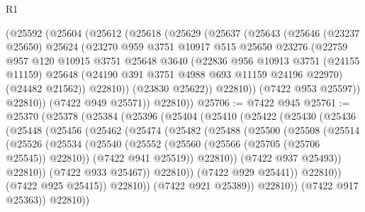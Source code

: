 \begin{lexlean}{R1}
\begin{coremodule}
      (@25592
        (@25604
          (@25612
            (@25618
              (@25629
                (@25637
                  (@25643
                    (@25646
                      (@23237 @25650)
                      @25624
                      (@23270
                        @959
                        @3751
                        @10917
                        @515
                        @25650
                        @23276
                        (@22759
                          @957
                          @120
                          @10915
                          @3751
                          @25648
                          @3640
                          (@22836
                            @956
                            @10913
                            @3751
                            (@24155 @11159)
                            @25648
                            (@24190 @391 @3751 @4988 @693 @11159 @24196 @22970)
                            (@24482 @21562))
                          @22810))
                      (@23830 @25622))
                    @22810))
                (@7422 @953 @25597))
              @22810))
          (@7422 @949 @25571))
        @22810))
@25706 := @7422 @945
@25761 := @25370
    (@25378
      (@25384
        (@25396
          (@25404
            (@25410
              (@25422
                (@25430
                  (@25436
                    (@25448
                      (@25456
                        (@25462
                          (@25474
                            (@25482
                              (@25488
                                (@25500
                                  (@25508
                                    (@25514
                                      (@25526
                                        (@25534
                                          (@25540
                                            (@25552
                                              (@25560 (@25566 (@25705 (@25706 @25545)) @22810))
                                              (@7422 @941 @25519))
                                            @22810))
                                        (@7422 @937 @25493))
                                      @22810))
                                  (@7422 @933 @25467))
                                @22810))
                            (@7422 @929 @25441))
                          @22810))
                      (@7422 @925 @25415))
                    @22810))
                (@7422 @921 @25389))
              @22810))
          (@7422 @917 @25363))
        @22810))

\end{coremodule}
\end{lexlean}
